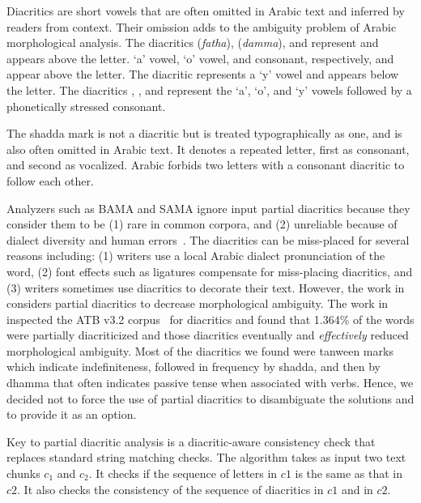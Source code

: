 Diacritics are short vowels that
are often omitted in Arabic text and inferred by readers from context. 
Their omission adds to the ambiguity problem of Arabic morphological analysis. 
\fullvocalize
The diacritics  ({\em fatha}),   ({\em damma}), and 
\transfalse{}\transtrue represent
and appears above the letter. 
`a' vowel,  `o' vowel, and consonant, respectively,  and appear above the letter. 
The diacritic  represents a `y' vowel and appears below the letter. 
The diacritics 
, , and  represent the `a', `o', and `y' vowels followed 
by a phonetically stressed \transtrue {} consonant. 

The shadda  mark is not a 
diacritic but is treated typographically as one, and is also often omitted in Arabic text. 
It denotes  a repeated letter, first as consonant, and second 
as vocalized.
Arabic forbids two letters with a consonant diacritic to follow each other. 


Analyzers such as BAMA and SAMA ignore input partial diacritics because 
they consider them to be (1) rare in common corpora, and (2) 
unreliable because of dialect diversity and human errors~\citep*{Elkateb:06,Attia:06b}. 
The diacritics can be miss-placed for several reasons including: 
(1) writers use a local Arabic dialect pronunciation of the word, 
(2) font effects such as ligatures compensate for miss-placing diacritics, 
and
(3) writers sometimes use diacritics to decorate their text. 
%
However, the work in \citep{Chaaben:10,Attia:00,Beesley:01} considers 
partial diacritics to decrease morphological ambiguity.
The work in~\cite{Maamouri:06} inspected the ATB v3.2 corpus~\citep*{Maamouri:04}
for diacritics and found that 1.364\% of the words were partially diacriticized and 
those diacritics eventually and {\em effectively} reduced morphological ambiguity.
Most of the diacritics we found were tanween marks which indicate indefiniteness, 
followed in frequency by shadda, and then by dhamma that often indicates 
passive tense when associated with verbs. 
Hence, we decided not to force the use of partial diacritics to disambiguate the 
solutions and to provide it as an option.

Key to partial diacritic analysis is a diacritic-aware consistency check that replaces
standard string matching checks. 
The  algorithm takes as input 
two text chunks $c_1$ and $c_2$. 
It checks if the sequence of letters in $c1$ is the same as that in $c2$. 
It also checks the consistency of the sequence of diacritics in $c1$ and in $c2$. 
%

